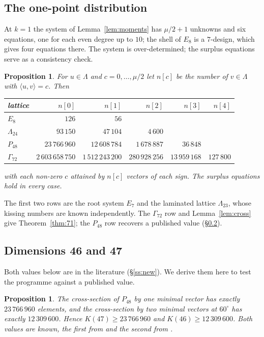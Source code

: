 \documentclass[11pt]{amsart}
\newtheorem{proposition}[theorem]{Proposition}
\theoremstyle{remark}
\newcommand{\Leech}{\Lambda_{24}}
\newcommand{\Pff}{P_{48}}
\newcommand{\Gsz}{\Gamma_{72}}
\newcommand{\ip}[2]{\langle #1,#2\rangle}
\begin{document}
\subsection{The one-point distribution}\label{ss:onepoint}

At $k=1$ the system of Lemma~\ref{lem:moments} has $\mu/2+1$ unknowns and six
equations, one for each even degree up to $10$; the shell of $E_8$ is a
$7$-design, which gives four equations there. The system is over-determined; the
surplus equations serve as a consistency check.

\begin{proposition}\label{prop:onepoint}
For $u\in\Lambda$ and $c=0,\dots,\mu/2$ let $n[c]$ be the number of $v\in\Lambda$
with $\ip{u}{v}=c$. Then
\begin{center}
\begin{tabular}{lrrrrr}
\toprule
lattice & $n[0]$ & $n[1]$ & $n[2]$ & $n[3]$ & $n[4]$\\
\midrule
$E_8$    & $126$ & $56$ & & & \\
$\Leech$ & $93\,150$ & $47\,104$ & $4\,600$ & & \\
$\Pff$   & $23\,766\,960$ & $12\,608\,784$ & $1\,678\,887$ & $36\,848$ & \\
$\Gsz$   & $2\,603\,658\,750$ & $1\,512\,243\,200$ & $280\,928\,256$ & $13\,959\,168$ & $127\,800$\\
\bottomrule
\end{tabular}
\end{center}
with each non-zero $c$ attained by $n[c]$ vectors of each sign. The surplus
equations hold in every case.
\end{proposition}

The first two rows are the root system $E_7$ and the laminated lattice
$\Lambda_{23}$, whose kissing numbers are known independently. The $\Gsz$ row and
Lemma~\ref{lem:cross} give Theorem~\ref{thm:71}; the $\Pff$ row recovers a
published value (\S\ref{ss:p48}).

\subsection{Dimensions 46 and 47}\label{ss:p48}

Both values below are in the literature (\S\ref{ss:new}). We derive them here to
test the programme against a published value.

\begin{proposition}\label{thm:47}
The cross-section of $\Pff$ by one minimal vector has exactly $23\,766\,960$
elements, and the cross-section by two minimal vectors at $60^\circ$ has exactly
$12\,309\,600$. Hence $K(47)\ge 23\,766\,960$ and $K(46)\ge 12\,309\,600$. Both
values are known, the first from \cite{boyvalenkov-cherkashin2025} and the second
from \cite{sun-wang2026}.
\end{proposition}
\end{document}
